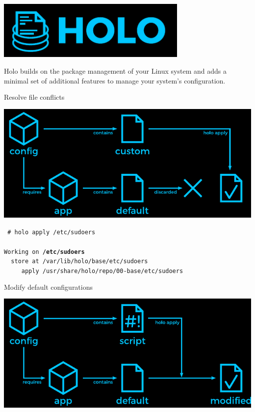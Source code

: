 \documentclass{beamer}
\begin{document}
\begin{frame}[plain,c]
 ~\vspace{3em}\par
 \centering
 \includegraphics[width=0.7\textwidth]{holo-logo.pdf}
 \vspace{1em}\par\color{holoonblack}
 \small Holo builds on the package management of your Linux system and adds a minimal set of additional features to manage your system's configuration.
\end{frame}

\begin{frame}[plain,t]{Resolve file conflicts}
 \vspace{-1em}\begin{center}
  \includegraphics[width=\linewidth]{diagram-files3.pdf}
 \end{center}
 \small\texttt{%
  {\color{holoonblack}\#} holo apply /etc/sudoers\\
  ~\\
  Working on \textbf{/etc/sudoers}\\
  ~~store at /var/lib/holo/base/etc/sudoers\\
  ~~~~~apply /usr/share/holo/repo/00-base/etc/sudoers
 }
\end{frame}

\begin{frame}[plain,t]{Modify default configurations}
 \vspace{-1em}\begin{center}
  \includegraphics[width=\linewidth]{diagram-files4.pdf}
 \end{center}
\end{frame}
\end{document}
